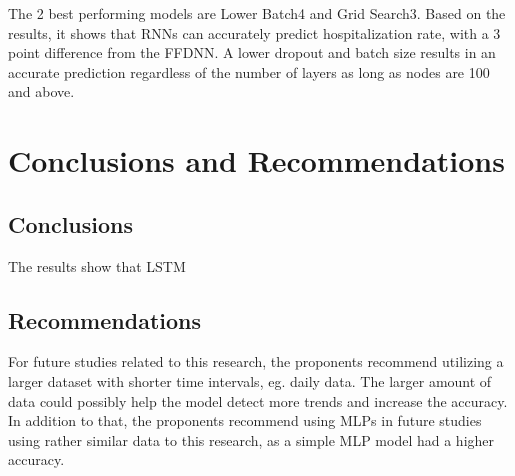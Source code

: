 \documentclass[10pt,11pt,12pt,oneside]{book}
\begin{document}
    The 2 best performing models are Lower Batch4 and Grid Search3. Based on the results, it shows that RNNs can accurately predict hospitalization rate, with a 3 point difference from the FFDNN. A lower dropout and batch size results in an accurate prediction regardless of the number of layers as long as nodes are 100 and above.
\chapter{Conclusions and Recommendations}
\section{Conclusions}
The results show that LSTM

\section{Recommendations}
For future studies related to this research, the proponents recommend utilizing a larger dataset with shorter time intervals, eg. daily data. The larger amount of data could possibly help the model detect more trends and increase the accuracy. In addition to that, the proponents recommend using MLPs in future studies using rather similar data to this research, as a simple MLP model had a higher accuracy.

    
    
\end{document}
